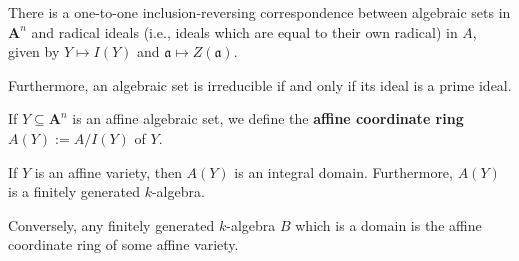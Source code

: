 \documentclass[12pt, oneside]{book}
\begin{document}
\begin{corollary}
    There is a one-to-one inclusion-reversing correspondence between algebraic sets in $\mathbf{A}^n$ and radical ideals (i.e., ideals which are equal to their own radical) in $A$, given by $Y \mapsto I(Y)$ and $\mathfrak{a} \mapsto Z(\mathfrak{a})$.

    Furthermore, an algebraic set is irreducible if and only if its ideal is a prime ideal.
\end{corollary}




\begin{definition}
    If $Y \subseteq \mathbf{A}^n$ is an affine algebraic set, we define the \textbf{affine coordinate ring} $A(Y):=A/I(Y)$ of $Y$.
    \begin{remark}
        If $Y$ is an affine variety, then $A(Y)$ is an integral domain. Furthermore, $A(Y)$ is a finitely generated $k$-algebra.

        Conversely, any finitely generated $k$-algebra $B$ which is a domain is the affine coordinate ring of some affine variety.
    \end{remark}
\end{definition}
\end{document}
